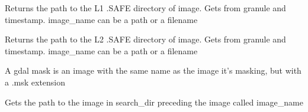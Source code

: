 \documentclass[letterpaper,10pt,english]{sphinxmanual}
\begin{document}

\begin{fulllineitems}
\label{\detokenize{index:pyeo.filesystem_utilities.get_l1_safe_file}}
Returns the path to the L1 .SAFE directory of image. Gets from granule and timestamp. image\_name can be a path or
a filename

\end{fulllineitems}


\begin{fulllineitems}
\label{\detokenize{index:pyeo.filesystem_utilities.get_l2_safe_file}}
Returns the path to the L2 .SAFE directory of image. Gets from granule and timestamp. image\_name can be a path or
a filename

\end{fulllineitems}


\begin{fulllineitems}
\label{\detokenize{index:pyeo.filesystem_utilities.get_mask_path}}
A gdal mask is an image with the same name as the image it’s masking, but with a .msk extension

\end{fulllineitems}


\begin{fulllineitems}
\label{\detokenize{index:pyeo.filesystem_utilities.get_preceding_image_path}}
Gets the path to the image in search\_dir preceding the image called image\_name

\end{fulllineitems}
\end{document}
